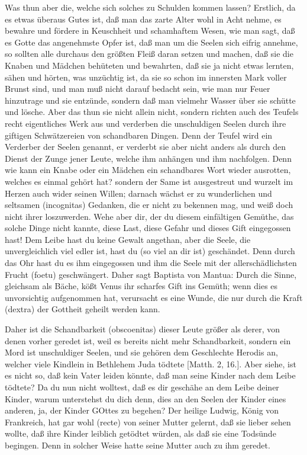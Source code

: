 Was thun aber die, welche sich solches zu Schulden kommen lassen? Erstlich, da es etwas überaus Gutes ist, daß man das zarte Alter wohl in Acht nehme, es bewahre und fördere in Keuschheit und schamhaftem Wesen, wie man sagt, daß es Gotte das angenehmste Opfer ist, daß man um die Seelen sich eifrig annehme, so sollten alle durchaus den größten Fleiß daran setzen und machen, daß sie die Knaben und Mädchen behüteten und bewahrten, daß sie ja nicht etwas lernten, sähen und hörten, was unzüchtig ist, da sie so schon im innersten Mark voller Brunst sind, und man muß nicht darauf bedacht sein, wie man nur Feuer hinzutrage und sie entzünde, sondern daß man vielmehr Wasser über sie schütte und lösche. Aber das thun sie nicht allein nicht, sondern richten auch des Teufels recht eigentliches Werk aus und verderben die unschuldigen Seelen durch ihre giftigen Schwätzereien von schandbaren Dingen. Denn der Teufel wird ein Verderber der Seelen genannt, er verderbt sie aber nicht anders als durch den Dienst der Zunge jener Leute, welche ihm anhängen und ihm nachfolgen. Denn wie kann ein Knabe oder ein Mädchen ein schandbares Wort wieder ausrotten, welches es einmal gehört hat? sondern der Same ist ausgestreut und wurzelt im Herzen auch wider seinen Willen; darnach wächst er zu wunderlichen und seltsamen (incognitas) Gedanken, die er nicht zu bekennen mag, und weiß doch nicht ihrer loszuwerden. Wehe aber dir, der du diesem einfältigen Gemüthe, das solche Dinge nicht kannte, diese Last, diese Gefahr und dieses Gift eingegossen hast! Dem Leibe hast du keine Gewalt angethan, aber die Seele, die unvergleichlich viel edler ist, hast du (so viel an dir ist) geschändet. Denn durch das Ohr hast du es ihm eingegossen und ihm die Seele mit der allerschädlichsten Frucht (foetu) geschwängert. Daher sagt Baptista von Mantua: Durch die Sinne, gleichsam als Bäche, kößt Venus ihr scharfes Gift ins Gemüth; wenn dies es unvorsichtig aufgenommen hat, verursacht es eine Wunde, die nur durch die Kraft (dextra) der Gottheit geheilt werden kann.

Daher ist die Schandbarkeit (obscoenitas) dieser Leute größer als derer, von denen vorher geredet ist, weil es bereits nicht mehr Schandbarkeit, sondern ein Mord ist unschuldiger Seelen, und sie gehören dem Geschlechte Herodis an, welcher viele Kindlein in Bethlehem Juda tödtete [Matth. 2, 16.]. Aber siehe, ist es nicht so, daß kein Vater leiden könnte, daß man seine Kinder nach dem Leibe tödtete? Da du nun nicht wolltest, daß es dir geschähe an dem Leibe deiner Kinder, warum unterstehst du dich denn, dies an den Seelen der Kinder eines anderen, ja, der Kinder GOttes zu begehen? Der heilige Ludwig, König von Frankreich, hat gar wohl (recte) von seiner Mutter gelernt, daß sie lieber sehen wollte, daß ihre Kinder leiblich getödtet würden, als daß sie eine Todsünde begingen. Denn in solcher Weise hatte seine Mutter auch zu ihm geredet.

